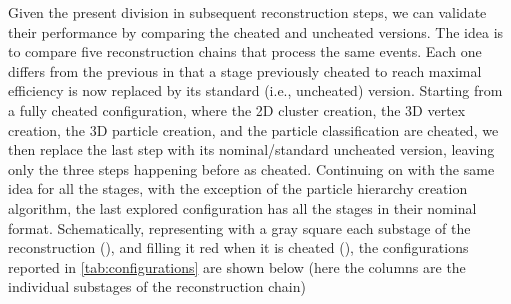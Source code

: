 Given the present division in subsequent reconstruction steps, we can validate their performance by comparing the cheated and uncheated versions. The idea is to compare five reconstruction chains that process the same events. Each one differs from the previous in that a stage previously cheated to reach maximal efficiency is now replaced by its standard (i.e., uncheated) version. Starting from a fully cheated configuration, where the 2D cluster creation, the 3D vertex creation, the 3D particle creation, and the particle classification are cheated, we then replace the last step with its nominal/standard uncheated version, leaving only the three steps happening before as cheated. Continuing on with the same idea for all the stages, with the exception of the particle hierarchy creation algorithm,  the last explored configuration has all the stages in their nominal format. Schematically, representing with a gray square each substage of the reconstruction ({\nominal}), and filling it red when it is cheated ({\cheated}), the configurations reported in \autoref{tab:configurations} are shown below (here the columns are the individual substages of the reconstruction chain)\begin{center}
\end{center}

